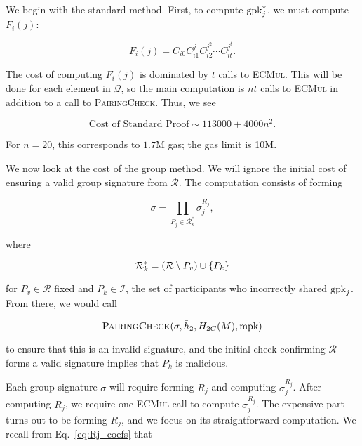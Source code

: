 

We begin with the standard method.
First, to compute $\textrm{gpk}_{j}^{*}$, we must compute $F_{i}(j)$:

\begin{equation}
    F_{i}(j) = C_{i0}C_{i1}^{j}C_{i2}^{j^{2}}\cdots C_{it}^{j^{t}}.
\end{equation}

\noindent
The cost of computing $F_{i}(j)$ is dominated by $t$ calls to \textsc{ECMul}.
This will be done for each element in $\mathcal{Q}$, so the
main computation is $nt$ calls to \textsc{ECMul} in addition
to a call to \textsc{PairingCheck}.
Thus, we see

\begin{equation}
    \text{Cost of Standard Proof} \sim 113000 + 4000n^{2}.
\end{equation}

\noindent
For $n=20$, this corresponds to $1.7$M gas; the gas limit
is 10M.

We now look at the cost of the group method.
We will ignore the initial cost of ensuring a valid group signature
from $\mathcal{R}$.
The computation consists of forming

\begin{equation}
    \sigma = \prod_{P_{j}\in\mathcal{R}^{*}_{k}} \sigma_{j}^{R_{j}},
\end{equation}

\noindent
where

\begin{equation}
    \mathcal{R}^{*}_{k} = \left( \mathcal{R}\setminus P_{v} \right)\cup
        \left\{ P_{k} \right\}
\end{equation}

\noindent
for $P_{v}\in\mathcal{R}$ fixed and $P_{k}\in\mathcal{I}$,
the set of participants who incorrectly shared $\textrm{gpk}_{j}$.
From there, we would call

\begin{equation}
    \textsc{PairingCheck}(\sigma, \bar{h}_{2}, H_{2C}(M), \text{mpk})
\end{equation}

\noindent
to ensure that this is an invalid signature,
and the initial check confirming $\mathcal{R}$ forms a valid
signature implies that $P_{k}$ is malicious.

Each group signature $\sigma$ will require forming $R_{j}$
and computing $\sigma_{j}^{R_{j}}$.
After computing $R_{j}$, we require one \textsc{ECMul} call
to compute $\sigma_{j}^{R_{j}}$.
The expensive part turns out to be forming $R_{j}$,
and we focus on its straightforward computation.
We recall from Eq.~\eqref{eq:Rj_coefs} that

